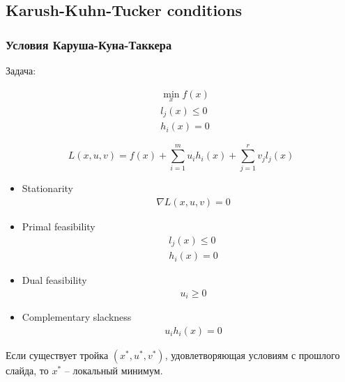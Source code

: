 \subsection{Karush-Kuhn-Tucker conditions}

\begin{frame}
  \frametitle{Условия Каруша-Куна-Таккера}
  Задача:

  \begin{align*}
    & \min_x f(x) \\
    & l_j(x) \leq 0 \\
    & h_i(x) = 0
  \end{align*}
\end{frame}

\begin{frame}
  \begin{equation*}
    L(x,u,v) = f(x) + \sum_{i=1}^{m} u_i h_i(x) + \sum_{j=1}^{r} v_j l_j(x) 
  \end{equation*}

\begin{itemize}

\item Stationarity
\begin{align*}
  & \nabla L(x, u, v) = 0 
  \end{align*}

  \item Primal feasibility
\begin{align*}
  & l_j(x) \leq 0 \\
  & h_i(x) = 0 
\end{align*}

\item Dual feasibility
  \begin{align*}
    & u_i \geq 0 
  \end{align*}

\item Complementary slackness
\begin{align*}
  & u_i h_i(x) = 0
\end{align*}

\end{itemize}

\end{frame}

\begin{frame}

Если существует тройка $(x^*, u^*, v^*)$, удовлетворяющая условиям с прошлого слайда, то $x^*$ -- локальный минимум.

%


\end{frame}
